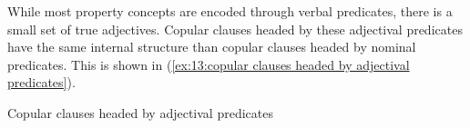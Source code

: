 While most property concepts are encoded through verbal predicates, there is a small set of true adjectives. Copular clauses headed by these adjectival predicates have the same internal structure than copular clauses headed by nominal predicates. This is shown in (\ref{ex:13:copular clauses headed by adjectival predicates}).

\ea\label{ex:13:copular clauses headed by adjectival predicates}
{Copular clauses headed by adjectival predicates}

    \z
\z






